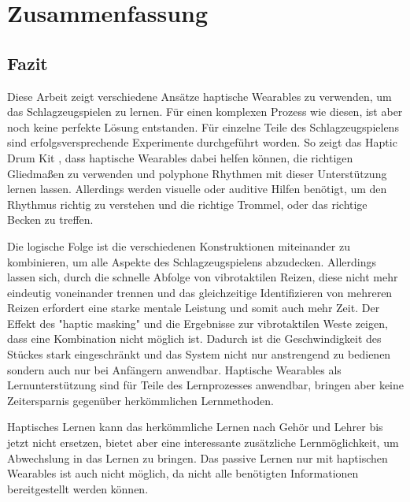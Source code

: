 \documentclass[ngerman,runningheads,a4paper]{llncs}
\begin{document}
\section{Zusammenfassung}
\subsection{Fazit}
Diese Arbeit zeigt verschiedene Ansätze haptische Wearables zu verwenden, um das Schlagzeugspielen zu lernen. Für einen komplexen Prozess wie diesen, ist aber noch keine perfekte Lösung entstanden. Für einzelne Teile des Schlagzeugspielens sind erfolgsversprechende Experimente durchgeführt worden. So zeigt das Haptic Drum Kit \cite{10.1145/1709886.1709892}, dass haptische Wearables dabei helfen können, die richtigen Gliedmaßen zu verwenden und polyphone Rhythmen mit dieser Unterstützung lernen lassen. Allerdings werden visuelle oder auditive Hilfen benötigt, um den Rhythmus richtig zu verstehen und die richtige Trommel, oder das richtige Becken zu treffen.

 Die logische Folge ist die verschiedenen Konstruktionen miteinander zu kombinieren, um alle Aspekte des Schlagzeugspielens abzudecken. Allerdings lassen sich, durch die schnelle Abfolge von vibrotaktilen Reizen, diese nicht mehr eindeutig voneinander trennen und das gleichzeitige Identifizieren von mehreren Reizen erfordert eine starke mentale Leistung und somit auch mehr Zeit. Der Effekt des "haptic masking" \cite{10.1145/1709886.1709892} und die Ergebnisse zur vibrotaktilen Weste zeigen, dass eine Kombination nicht möglich ist. Dadurch ist die Geschwindigkeit des Stückes stark eingeschränkt und das System nicht nur anstrengend zu bedienen sondern auch nur bei Anfängern anwendbar. Haptische Wearables als Lernunterstützung sind für Teile des Lernprozesses anwendbar, bringen aber keine Zeitersparnis gegenüber herkömmlichen Lernmethoden.

Haptisches Lernen kann das herkömmliche Lernen nach Gehör und Lehrer bis jetzt nicht ersetzen, bietet aber eine interessante zusätzliche Lernmöglichkeit, um Abwechslung in das Lernen zu bringen.
Das passive Lernen nur mit haptischen Wearables ist auch nicht möglich, da nicht alle benötigten Informationen bereitgestellt werden können.
\end{document}
